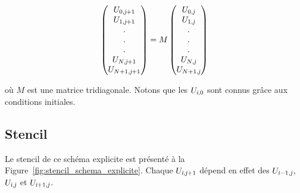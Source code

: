 \documentclass[a4paper, 12pt]{report}
\begin{document}
\begin{equation}
\begin{pmatrix}
   U_{0,\textsl{j}+1} \\
   U_{1,\textsl{j}+1} \\
   .\\
   .\\
   .\\
   U_{N,\textsl{j}+1}\\
   U_{N+1,\textsl{j}+1}
\end{pmatrix}
=
M
\begin{pmatrix}
   U_{0,\textsl{j}} \\
   U_{1,\textsl{j}} \\
   .\\
   .\\
   .\\
   U_{N,\textsl{j}}\\
   U_{N+1,\textsl{j}}
\end{pmatrix}
\end{equation}

où $M$ est une matrice tridiagonale. Notons que les $U_{\textsl{i},0}$ sont connus
grâce aux conditions initiales.

\subsection*{Stencil}

Le stencil de ce schéma explicite est présenté
à la Figure~\ref{fig:stencil_schema_explicite}. Chaque $U_{\textsl{i},\textsl{j}+1}$ dépend
en effet des $U_{\textsl{i}-1,\textsl{j}}$, $U_{\textsl{i},\textsl{j}}$ et $U_{\textsl{i}+1,\textsl{j}}$.
\end{document}
